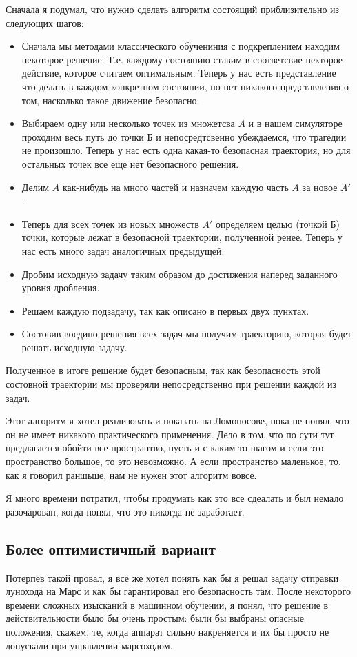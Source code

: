 \documentclass[a4paper]{article}
\begin{document}
Сначала я подумал, что нужно сделать алгоритм состоящий приблизительно из следующих шагов:
\begin{itemize}
\item Сначала мы методами классического обучениния с подкреплением находим некоторое решение. Т.е. каждому состоянию ставим в соответсвие некторое действие, которое считаем оптимальным. Теперь у нас есть представление что делать в каждом конкретном состоянии, но нет никакого представления о том, насколько такое движение безопасно.
\item Выбираем одну или несколько точек из множетсва $A$ и в нашем симуляторе проходим весь путь до точки Б и непосредтсвенно убеждаемся, что трагедии не произошло. Теперь у нас есть одна какая-то безопасная траектория, но для остальных точек все еще нет безопасного решения.

\item Делим $A$ как-нибудь на много частей и назначем каждую часть $A$ за новое $A'$.
\item Теперь для всех точек из новых множеств $A'$ определяем целью (точкой Б) точки, которые лежат в безопасной траектории, полученной ренее.  Теперь у нас есть много задач аналогичных предыдущей. 
\item Дробим исходную задачу таким образом до достижения наперед заданного уровня дробления. 
\item Решаем каждую подзадачу, так как описано в первых двух пунктах.
\item Состовив воедино решения всех задач мы получим траекторию, которая будет решать исходную задачу.


\end{itemize}

Полученное в итоге решение будет безопасным, так как безопасность этой состовной траектории мы проверяли непосредственно при решении каждой из задач.

Этот алгоритм я хотел реализовать и показать на Ломоносове, пока не понял, что он не имеет никакого практического применения. Дело в том, что по сути тут предлагается обойти все пространтво, пусть и с каким-то шагом и если это пространство большое, то это невозможно. А если пространство маленькое, то, как я говорил раншьше, нам не нужен этот алгоритм вовсе.

Я много времени потратил, чтобы продумать как это все сдеалать и был немало разочарован, когда понял, что это никогда не заработает.


\subsection{Более оптимистичный вариант}
Потерпев такой провал, я все же хотел понять как бы я решал задачу отправки лунохода на Марс и как бы гарантировал его безопасность там.
После некоторого времени сложных изысканий в машинном обучении, я понял, что решение в действительности было бы очень простым: были бы выбраны опасные положения, скажем, те, когда аппарат сильно накреняется и их бы просто не допускали при управлении марсоходом. 
\end{document}

